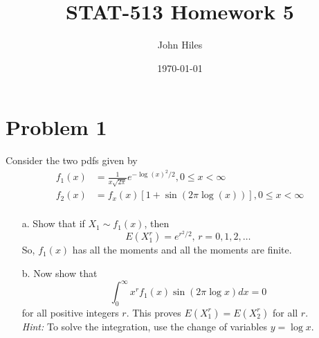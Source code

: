 \documentclass{article}
\title{STAT-513 Homework 5}
\author{John Hiles}
\date\today
\begin{document}
\maketitle %


\section*{Problem 1}
Consider the two pdfs given by
  \[
	\begin{aligned}
    f_1(x)&=\frac{1}{x\sqrt{2\pi}}e^{-\log(x)^2/2}, 0\le x <\infty\\
    f_2(x)&=f_x(x)[1 + \sin(2\pi\log(x))], 0\le x <\infty\\
	\end{aligned}
  \]
    \begin{enumerate}
    \item[a.]
      Show that if $X_1 \sim f_1(x)$, then
      \[
      E(X_{1}^{r}) = e^{r^2/2}, \, r = 0,1,2,\dots
      \]
      So, $f_1(x)$ has all the moments and all the moments are finite.
    \item[b.]
      Now show that
      \[
      \int_{0}^{\infty}x^rf_1(x)\sin(2\pi\log x)dx=0
      \]
      for all positive integers $r$. This proves $E(X_{1}^{r}) = E(X_{2}^{r})$ for all $r$.\\
      \textit{Hint:} To solve the integration, use the change of variables $y = \log x$.
    \end{enumerate}
    
\end{document}
